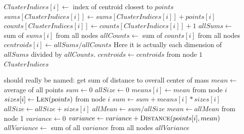 \documentclass{article}
\begin{document}
\begin{algorithm}
\caption{}
\begin{algorithmic}[1]
				\State $ClusterIndices[i] \gets$ index of centroid closest to $points$
			\EndFor
				\State $sums[ClusterIndices[i]] \gets sums[ClusterIndices[i]] + points[i]$
				\State $counts[ClusterIndices[i]] \gets counts[ClusterIndices[i]] + 1$
			\EndFor
					\State $allSums \gets$ sum of $sums[i]$ from all nodes
					\State $allCounts \gets$ sum of $counts[i]$ from all nodes
					\State $centroids[i] \gets allSums / allCounts$ \Comment Here it is actually
					each dimension of $allSums$ divided by $allCounts$.
				\EndFor
			\EndIf
			\State $centroids \gets centroids$ from node $1$
		\EndWhile
		\State \Return $ClusterIndices$
	\EndFunction
\end{algorithmic}
\end{algorithm}

\begin{algorithm}
\caption{}
\begin{algorithmic}[1]
	 \Comment should really be named: get sum of distance to overall
	center of mass
		\State $mean \gets$ average of all points
			\State $sum \gets 0$
			\State $allSize \gets 0$
				\State $means[i] \gets mean$ from node $i$
				\State $sizes[i] \gets \Call{Len}{points}$ from node $i$
				\State $sum \gets sum + means[i] * sizes[i]$
				\State $allSize \gets allSize + sizes[i]$
			\EndFor
			\State $allMean \gets sum / allSize$
		\EndIf
		\State $mean \gets allMean$ from node 1
		\State $variance \gets 0$
			\State $variance \gets variance + \Call{Distance}{points[i], mean}$
		\EndFor
		\State $allVariance \gets$ sum of all $variance$ from all nodes
		\State \Return $allVariance$
	\EndFunction
\end{algorithmic}
\end{algorithm}
\end{document}
